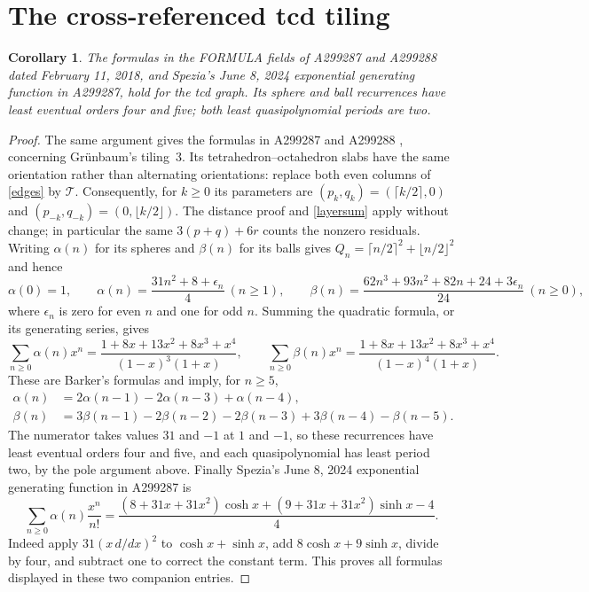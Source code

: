 \documentclass[11pt]{article}
\newtheorem{corollary}[theorem]{Corollary}
\newcommand{\T}{\mathcal T}
\begin{document}
\section{The cross-referenced tcd tiling}
\begin{corollary}\label{tcdresults}
The formulas in the FORMULA fields of A299287 and A299288
dated February 11, 2018, and Spezia's June 8, 2024 exponential
generating function in A299287, hold for the tcd graph. Its sphere and
ball recurrences have least eventual orders four and five; both least
quasipolynomial periods are two.
\end{corollary}
\begin{proof}
The same argument gives the formulas in A299287 and A299288
\cite{tcd,tcdball}, concerning Gr\"unbaum's tiling~3. Its tetrahedron--octahedron
slabs have the same orientation rather than alternating orientations:
replace both even columns of \eqref{edges} by $\T$.
Consequently, for $k\ge0$ its parameters are
$(p_k,q_k)=(\lceil k/2\rceil,0)$ and
$(p_{-k},q_{-k})=(0,\lfloor k/2\rfloor)$.
The distance proof and \eqref{layersum} apply without change; in particular
the same $3(p+q)+6r$ counts the nonzero residuals.
Writing $\alpha(n)$ for its spheres and $\beta(n)$ for its balls gives
$Q_n=\lceil n/2\rceil^2+\lfloor n/2\rfloor^2$ and hence
\[
\alpha(0)=1,\qquad
\alpha(n)=\frac{31n^2+8+\epsilon_n}{4}\ (n\ge1),\qquad
\beta(n)=\frac{62n^3+93n^2+82n+24+3\epsilon_n}{24}\ (n\ge0),
\]
where $\epsilon_n$ is zero for even $n$ and one for odd $n$.
Summing the quadratic formula, or its generating series, gives
\[
\sum_{n\ge0}\alpha(n)x^n=\frac{1+8x+13x^2+8x^3+x^4}{(1-x)^3(1+x)},\qquad
\sum_{n\ge0}\beta(n)x^n=\frac{1+8x+13x^2+8x^3+x^4}{(1-x)^4(1+x)}.
\]
These are Barker's formulas and imply, for $n\ge5$,
\begin{align*}
\alpha(n)&=2\alpha(n-1)-2\alpha(n-3)+\alpha(n-4),\\
\beta(n)&=3\beta(n-1)-2\beta(n-2)-2\beta(n-3)+3\beta(n-4)-\beta(n-5).
\end{align*}
The numerator takes values $31$ and $-1$ at $1$ and $-1$, so these
recurrences have least eventual orders four and five, and each
quasipolynomial has least period two, by the pole argument above.
Finally Spezia's June 8, 2024 exponential generating function in A299287 is
\[
\sum_{n\ge0}\alpha(n)\frac{x^n}{n!}
=\frac{(8+31x+31x^2)\cosh x+(9+31x+31x^2)\sinh x-4}{4}.
\]
Indeed apply $31(x\,d/dx)^2$ to $\cosh x+\sinh x$, add
$8\cosh x+9\sinh x$, divide by four, and subtract one to correct
the constant term. This proves all formulas displayed in these two
companion entries.
\end{proof}
\end{document}
